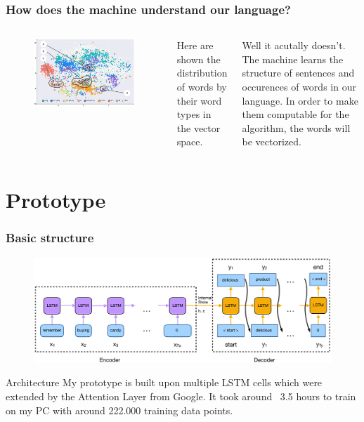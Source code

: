 \documentclass{beamer}
\begin{document}

\begin{frame}
	\frametitle{How does the machine understand our language?}
	\begin{columns}
		\begin{figure}
			\includegraphics[width=.9\linewidth]{photo/generate_text}
		\end{figure}
	   Here are shown the distribution of words by their word types in the vector space.
	
				Well it acutally doesn't. The machine learns the structure of sentences and occurences of words in our language. In order to make them computable for the algorithm, the words will be vectorized.
	\end{columns}
	
\end{frame}


\section{Prototype}

\begin{frame}
\frametitle{Basic structure}
\begin{figure}
	\includegraphics[width=.9\linewidth]{photo/infer-1}
\end{figure}

\begin{block}{Architecture}
	My prototype is built upon multiple LSTM cells which were extended by the Attention Layer from Google. It took around ~3.5 hours to train on my PC with around 222.000 training data points.
\end{block}
\end{frame}
\end{document}
